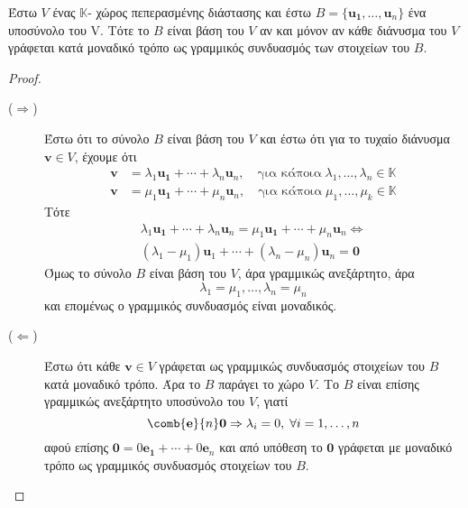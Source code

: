\begin{thm}
\item {}
    Έστω $V$ ένας $ \mathbb{K} $- χώρος πεπερασμένης διάστασης και έστω 
    $ B = \{ \mathbf{u_{1}}, \ldots, \mathbf{u}_{n} \} $ ένα υποσύνολο του V. Τότε 
    το $B$ είναι βάση του $V$ αν και μόνον αν κάθε διάνυσμα του $V$ γράφεται 
    κατά μοναδικό τϱόπο ως γραμμικός συνδυασμός των στοιχείων του $B$.
\end{thm}
\begin{proof}
\item {}
    \begin{description}
        \item [($ \Rightarrow $)]
            Έστω ότι το σύνολο $B$ είναι βάση του $V$ και έστω ότι για το 
            τυχαίο διάνυσμα $ \mathbf{v} \in V $, έχουμε ότι 
            \begin{align*} 
                \mathbf{v} &= \lambda _{1} \mathbf{u_{1}}+ \cdots + \lambda _{n} 
                \mathbf{u}_{n}, \quad \text{για κάποια} \;  \lambda _{1}, \ldots, 
                \lambda _{n} \in \mathbb{K}  \\
                \mathbf{v} &= \mu_{1} \mathbf{u_{1}}+ \cdots + \mu _{n} 
                \mathbf{u}_{n}, \quad \text{για κάποια} \;  \mu _{1}, \ldots, 
                \mu _{k} \in \mathbb{K}
            \end{align*}
            Τότε 
            \begin{gather*}
                \lambda _{1} \mathbf{u_{1}}+ \cdots + \lambda _{n} \mathbf{u}_{n} = 
                \mu_{1} \mathbf{u_{1}}+ \cdots + \mu _{n} \mathbf{u}_{n} 
                \Leftrightarrow \\
                (\lambda _{1}- \mu _{1}) \mathbf{u}_{1} + \cdots + (\lambda _{n} - 
                \mu _{n}) \mathbf{u}_{n} = \mathbf{0}
            \end{gather*}
            Όμως το σύνολο $B$ είναι βάση του $V$, άρα γραμμικώς ανεξάρτητο, άρα 
            \[
                \lambda _{1} = \mu _{1}, \ldots, \lambda _{n} = \mu _{n} 
            \] 
            και επομένως ο γραμμικός συνδυασμός είναι μοναδικός.
        \item [($ \Leftarrow $)] 
            Έστω ότι κάθε $ \mathbf{v} \in V $ γράφεται ως γραμμικώς συνδυασμός 
            στοιχείων του $B$ κατά μοναδικό τρόπο. Άρα το $B$ παράγει το χώρο $V$. 
            Το $B$ είναι επίσης γραμμικώς ανεξάρτητο υποσύνολο του $V$, γιατί 
            \[
                \comb{\mathbf{e}}{n} \mathbf{0} \Rightarrow \lambda _{i} = 0, \; 
                \forall i=1,\ldots, n
            \] 
            αφού επίσης $ \mathbf{0} = 0 \mathbf{e_{1}}+\cdots + 0 \mathbf{e}_{n} $ 
            και από υπόθεση το $ \mathbf{0} $ γράφεται με μοναδικό τρόπο ως γραμμικός 
            συνδυασμός στοιχείων του $B$.
    \end{description} 
\end{proof}


